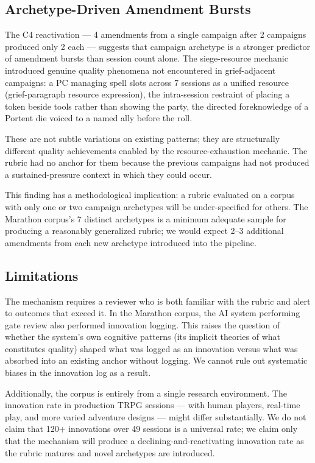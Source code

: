 \subsection{Archetype-Driven Amendment Bursts}

The C4 reactivation --- 4 amendments from a single campaign after 2 campaigns produced
only 2 each --- suggests that campaign archetype is a stronger predictor of amendment
bursts than session count alone. The siege-resource mechanic introduced genuine quality
phenomena not encountered in grief-adjacent campaigns: a PC managing spell slots
across 7 sessions as a unified resource (grief-paragraph resource expression), the
intra-session restraint of placing a token beside tools rather than showing the party,
the directed foreknowledge of a Portent die voiced to a named ally before the roll.

These are not subtle variations on existing patterns; they are structurally different
quality achievements enabled by the resource-exhaustion mechanic. The rubric had no
anchor for them because the previous campaigns had not produced a sustained-pressure
context in which they could occur.

This finding has a methodological implication: a rubric evaluated on a corpus with
only one or two campaign archetypes will be under-specified for others. The Marathon
corpus's 7 distinct archetypes is a minimum adequate sample for producing a
reasonably generalized rubric; we would expect 2--3 additional amendments from each
new archetype introduced into the pipeline.

\subsection{Limitations}

The mechanism requires a reviewer who is both familiar with the rubric and alert to
outcomes that exceed it. In the Marathon corpus, the AI system performing gate review
also performed innovation logging. This raises the question of whether the system's
own cognitive patterns (its implicit theories of what constitutes quality) shaped
what was logged as an innovation versus what was absorbed into an existing anchor
without logging. We cannot rule out systematic biases in the innovation log as a result.

Additionally, the corpus is entirely from a single research environment. The innovation
rate in production TRPG sessions --- with human players, real-time play, and more
varied adventure designs --- might differ substantially. We do not claim that 120+
innovations over 49 sessions is a universal rate; we claim only that the mechanism
will produce a declining-and-reactivating innovation rate as the rubric matures
and novel archetypes are introduced.
